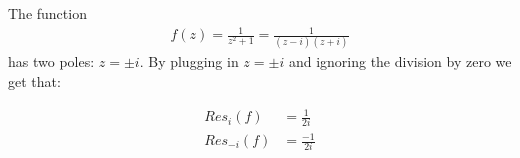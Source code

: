 \begin{example}
The function
\begin{align*}
f(z) = \frac{1}{z^2+1} = \frac{1}{(z-i)(z+i)}
\end{align*}
has two poles: $z = \pm i$. By plugging in $z= \pm i$ and ignoring the division by zero we get that:

\begin{align*}
    Res_i(f) &= \frac{1}{2i}\\
    Res_{-i}(f) &= \frac{-1}{2i}\\
\end{align*}

\end{example}









